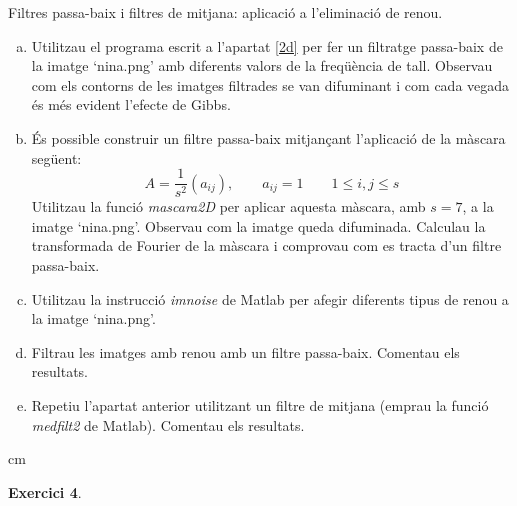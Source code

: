 \documentclass{article}
\begin{document}
Filtres passa-baix i filtres de mitjana: aplicaci\'o a
l'eliminaci\'o de renou.
\begin{enumerate}[a)]
 \item \label{3a} Utilitzau el programa escrit a l'apartat \ref{2d}
 per fer un filtratge passa-baix de la imatge `nina.png' amb diferents
valors de la freq\"u\`encia de tall. Observau com els contorns de
les imatges filtrades se van difuminant i com cada vegada \'es
m\'es evident l'efecte de Gibbs.

\item \label{3b} \'Es possible construir un filtre passa-baix
mitjan\c{c}ant l'aplicaci\'o de la m\`ascara seg\"uent:
\[
A=\frac{1}{s^2}(a_{ij}), \qquad a_{ij}=1
\qquad 1 \leq i,j \leq s
\]
\noindent Utilitzau la funci\'o {\it mascara2D} per aplicar
aquesta m\`ascara, amb $s=7$, a la imatge `nina.png'.
\newline
\noindent Observau com la imatge queda difuminada. Calculau la
transformada de Fourier de la m\`ascara i comprovau com es tracta
d'un filtre passa-baix.

\item \label{3c} Utilitzau la instrucci\'o {\it imnoise} de Matlab
per afegir diferents tipus de renou a la imatge `nina.png'.

\item \label{3d} Filtrau les imatges amb renou amb un filtre
passa-baix. Comentau els resultats.

\item \label{3e} Repetiu l'apartat anterior utilitzant un filtre
de mitjana (emprau la funci\'o {\it medfilt2} de Matlab). Comentau
els resultats.

\end{enumerate}


 cm

\noindent \textbf{Exercici 4}. \label{ex4}
\newline
\end{document}
